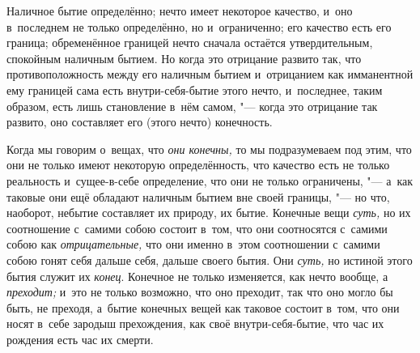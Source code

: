Наличное бытие определённо; нечто имеет некоторое качество, и~оно в~последнем
не только определённо, но и~ограниченно; его качество есть его граница;
обременённое границей нечто сначала остаётся утвердительным, спокойным
наличным бытием. Но когда это отрицание развито так, что противоположность
между его наличным бытием и~отрицанием как имманентной ему границей сама
есть внутри-себя-бытие этого нечто, и~последнее, таким образом, есть лишь
становление в~нём самом, "--- когда это отрицание так развито, оно составляет
его (этого нечто) конечность.

Когда мы говорим о~вещах, что {\em они конечны,} то мы
подразумеваем под этим, что они не только имеют некоторую определённость,
что качество есть не только реальность и~сущее-в-себе определение, что они не
только ограничены, "--- а~как таковые они ещё обладают наличным бытием вне
своей границы, "--- но что, наоборот, небытие составляет их природу, их бытие.
Конечные вещи {\em суть,} но их соотношение с~самими
собою состоит в~том, что они соотносятся с~самими собою как
{\em отрицательные,} что они именно в~этом соотношении
с~самими собою гонят себя дальше себя, дальше своего бытия. Они
{\em суть,} но истиной этого бытия служит их
{\em конец}. Конечное не только изменяется, как нечто
вообще, а {\em преходит;} и~это не только возможно, что
оно преходит, так что оно могло бы быть, не преходя, а~бытие конечных вещей
как таковое состоит в~том, что они носят в~себе зародыш прехождения, как
своё внутри-себя-бытие, что час их рождения есть час их смерти.


